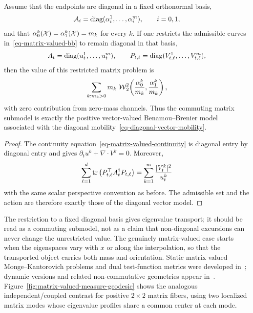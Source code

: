 \begin{prop}\label{prop-matrix-diagonal-reduction}
Assume that the endpoints are diagonal in a fixed orthonormal basis,
\[
	\mathcal A_i=\operatorname{diag}(\alpha_i^1,\ldots,\alpha_i^m),
	\qquad i=0,1,
\]
and that $\alpha_0^k(\mathcal{X})=\alpha_1^k(\mathcal{X})=m_k$ for every $k$. If one restricts the admissible curves in~\eqref{eq-matrix-valued-bb} to remain diagonal in that basis,
\[
	A_t=\operatorname{diag}(u_t^1,\ldots,u_t^m),
	\qquad
	P_{t,\ell}=\operatorname{diag}(V_{t,\ell}^1,\ldots,V_{t,\ell}^m),
\]
then the value of this restricted matrix problem is
\[
	\sum_{k:m_k>0} m_k\,\operatorname{\mathcal{W}}_2^2\!\left(\frac{\alpha_0^k}{m_k},\frac{\alpha_1^k}{m_k}\right),
\]
with zero contribution from zero-mass channels. Thus the commuting matrix submodel is exactly the positive vector-valued Benamou--Brenier model associated with the diagonal mobility~\eqref{eq-diagonal-vector-mobility}.
\end{prop}
\begin{proof}
The continuity equation~\eqref{eq-matrix-valued-continuity} is diagonal entry by diagonal entry and gives $\partial_t u^k+\nabla\cdot V^k=0$. Moreover,
\[
	\sum_{\ell=1}^d \operatorname{tr}\big(P_{t,\ell}^{\top}A_t^\dagger P_{t,\ell}\big)
	=
	\sum_{k=1}^m \frac{|V_t^k|^2}{u_t^k}
\]
with the same scalar perspective convention as before. The admissible set and the action are therefore exactly those of the diagonal vector model.
\end{proof}

The restriction to a fixed diagonal basis gives eigenvalue transport; it should be read as a commuting submodel, not as a claim that non-diagonal excursions can never change the unrestricted value. The genuinely matrix-valued case starts when the eigenspaces vary with $x$ or along the interpolation, so that the transported object carries both mass and orientation. Static matrix-valued Monge--Kantorovich problems and dual test-function metrics were developed in~\cite{Ning2014metrics,JiangSpectral,ning2015matrix}; dynamic versions and related non-commutative geometries appear in~\cite{Chen2016,ChenGangbo17,Carlen2014,2016-peyre-qot}. Figure~\ref{fig:matrix-valued-measure-geodesic} shows the analogous independent/coupled contrast for positive $2\times2$ matrix fibers, using two localized matrix modes whose eigenvalue profiles share a common center at each mode.

